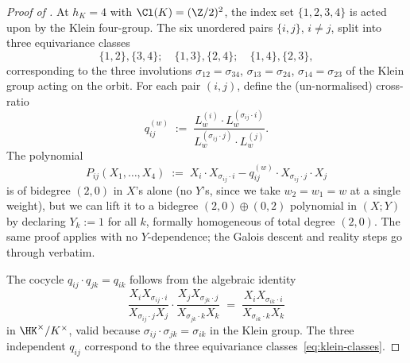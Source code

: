 \begin{proof}[Proof of ]
At $h_K = 4$ with $\Cl(K) = (\Z/2)^2$, the index set
$\{1, 2, 3, 4\}$ is acted upon by the Klein four-group. The six
unordered pairs $\{i, j\}$, $i \neq j$, split into three
equivariance classes
\begin{equation}\label{eq:klein-classes}
\{1, 2\}, \{3, 4\}; \quad \{1, 3\}, \{2, 4\}; \quad \{1, 4\}, \{2, 3\},
\end{equation}
corresponding to the three involutions $\sigma_{12} = \sigma_{34}$,
$\sigma_{13} = \sigma_{24}$, $\sigma_{14} = \sigma_{23}$ of the
Klein group acting on the orbit. For each pair $(i, j)$, define
the (un-normalised) cross-ratio
\begin{equation}\label{eq:q-ij}
q_{ij}^{(w)} \;:=\;
\frac{L_w^{(i)} \cdot L_w^{(\sigma_{ij} \cdot i)}}
     {L_w^{(\sigma_{ij} \cdot j)} \cdot L_w^{(j)}}.
\end{equation}
The polynomial
\[
P_{ij}(X_1, \dots, X_4) \;:=\;
X_i \cdot X_{\sigma_{ij} \cdot i} - q_{ij}^{(w)} \cdot
X_{\sigma_{ij} \cdot j} \cdot X_j
\]
is of bidegree $(2, 0)$ in $X$'s alone (no $Y$'s, since we take
$w_2 = w_1 = w$ at a single weight), but we can lift it to a
bidegree $(2, 0) \oplus (0, 2)$ polynomial in $(X; Y)$ by
declaring $Y_k := 1$ for all $k$, formally homogeneous of total
degree $(2, 0)$. The same proof applies with no $Y$-dependence;
the Galois descent and reality steps go through verbatim.

The cocycle $q_{ij} \cdot q_{jk} = q_{ik}$ follows from the
algebraic identity
\[
\frac{X_i X_{\sigma_{ij} \cdot i}}{X_{\sigma_{ij} \cdot j} X_j}
\cdot
\frac{X_j X_{\sigma_{jk} \cdot j}}{X_{\sigma_{jk} \cdot k} X_k}
\;=\;
\frac{X_i X_{\sigma_{ik} \cdot i}}{X_{\sigma_{ik} \cdot k} X_k}
\]
in $\HK^\times / K^\times$, valid because $\sigma_{ij} \cdot
\sigma_{jk} = \sigma_{ik}$ in the Klein group. The three
independent $q_{ij}$ correspond to the three equivariance
classes~\eqref{eq:klein-classes}.
\end{proof}

